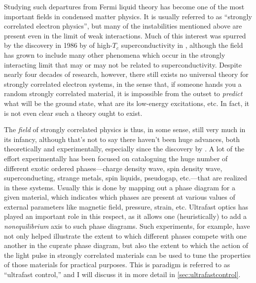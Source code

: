Studying such departures from Fermi liquid theory has become one of the most important fields in condensed matter physics.
It is usually referred to as ``strongly correlated electron physics'', but many of the instabilities mentioned above are present even in the limit of weak interactions.
Much of this interest was spurred by the discovery in \num{1986} by \citet{bednorz_possible_1986} of high-$T_c$ superconductivity in , although the field has grown to include many other phenomena which occur in the strongly interacting limit that may or may not be related to superconductivity.
Despite nearly four decades of research, however, there still exists no universal theory for strongly correlated electron systems, in the sense that, if someone hands you a random strongly correlated material, it is impossible from the outset to \emph{predict} what will be the ground state, what are its low-energy excitations, etc.
In fact, it is not even clear such a theory ought to exist\citep{alexandradinata_future_2022}.

The \emph{field} of strongly correlated physics is thus, in some sense, still very much in its infancy, although that's not to say there haven't been huge advances, both theoretically and experimentally, especially since the discovery by \citet{bednorz_possible_1986}.
A lot of the effort experimentally has been focused on cataloguing the huge number of different exotic ordered phases---charge density wave, spin density wave, superconducting, strange metals, spin liquids, pseudogap, etc.---that are realized in these systems.
Usually this is done by mapping out a phase diagram for a given material, which indicates which phases are present at various values of external parameters like magnetic field, pressure, strain, etc.
Ultrafast optics has played an important role in this respect, as it allows one (heuristically) to add a \emph{nonequilibrium} axis to such phase diagrams.
Such experiments, for example, have not only helped illustrate the extent to which different phases compete with one another in the cuprate phase diagram, but also the extent to which the action of the light pulse in strongly correlated materials can be used to tune the properties of those materials for practical purposes.
This is paradigm is referred to as ``ultrafast control,'' and I will discuss it in more detail in \cref{sec:ultrafastcontrol}.

